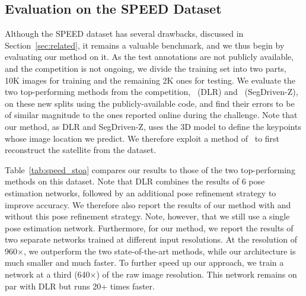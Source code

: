 \subsection{Evaluation on the SPEED Dataset}
Although the SPEED dataset has several drawbacks, discussed in Section~\ref{sec:related}, it remains a valuable benchmark, and we thus begin by evaluating our method on it. As the test annotations are not publicly available, and the competition is not ongoing, we divide the training set into two parts, 10K images for training and the remaining 2K ones for testing.
We evaluate the two top-performing methods from the competition,~\cite{Chen19DLR} (DLR) 
and~\cite{Hu19a} (SegDriven-Z), on these new splits using the publicly-available code, and find their errors to be of similar magnitude to the ones reported online during the challenge.
Note that our method, as DLR and SegDriven-Z, uses the 3D model to define the keypoints whose image location we predict. We therefore exploit a method of~\cite{Hartley00} to first reconstruct the satellite from the dataset. 

Table~\ref{tab:speed_stoa} compares our results to those of the two top-performing methods on this dataset. Note that DLR combines the results of 6 pose estimation networks, followed by an additional pose refinement strategy to improve accuracy. We therefore also report the results of our method with and without this pose refinement strategy. Note, however, that we still use a single pose estimation network. Furthermore, for our method, we report the results of two separate networks trained at different input resolutions. 
At the resolution of 960$\times$, we outperform the two state-of-the-art methods, while our architecture is much smaller and much faster. To further speed up our approach, we train a network at a third (640$\times$) of the raw image resolution. This network remains on par with DLR but runs 20+ times faster.

